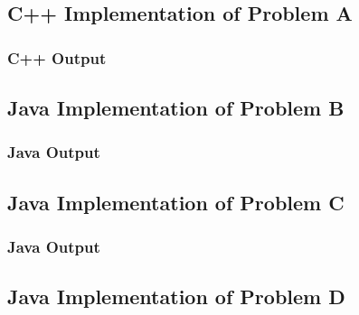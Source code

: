 \documentclass[11pt]{article}
\begin{document}
\subsection{C++ Implementation of Problem A}



\subsubsection{C++ Output}


\subsection{Java Implementation of Problem B}



\subsubsection{Java Output}


\subsection{Java Implementation of Problem C}



\subsubsection{Java Output}


\subsection{Java Implementation of Problem D}


\end{document}
